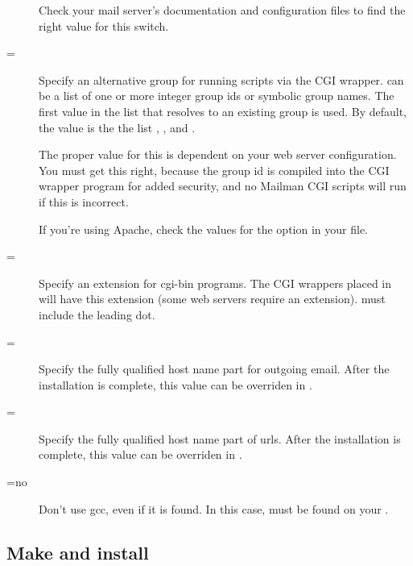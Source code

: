 \documentclass{howto}
\begin{document}
\begin{description}
    Check your mail server's documentation and configuration files to find the
    right value for this switch.

\item[\longprogramopt{with-cgi-gid}=\var{group-or-groups}]
    Specify an alternative group for running scripts via the CGI wrapper.
     can be a list of one or more integer group ids or
    symbolic group names.  The first value in the list that resolves to an
    existing group is used.  By default, the value is the the list
    , , and .

    \begin{notice}[note]
    The proper value for this is dependent on your web server configuration.
    You must get this right, because the group id is compiled into the CGI
    wrapper program for added security, and no Mailman CGI scripts will run if
    this is incorrect.
    \end{notice}

    If you're using Apache, check the values for the  option in
    your  file.

\item[\longprogramopt{with-cgi-ext}=\var{extension}]
    Specify an extension for cgi-bin programs.  The CGI wrappers placed in
     will have this extension (some web servers
    require an extension).   must include the leading dot.

\item[\longprogramopt{with-mailhost}=\var{hostname}]
    Specify the fully qualified host name part for outgoing email.  After the
    installation is complete, this value can be overriden in
    .

\item[\longprogramopt{with-urlhost}=\var{hostname}]
    Specify the fully qualified host name part of urls.  After the
    installation is complete, this value can be overriden in
    .

\item[\longprogramopt{with-gcc}=no]
    Don't use gcc, even if it is found.  In this case,  must be
    found on your .

\end{description}

\subsection{Make and install}
\end{document}

